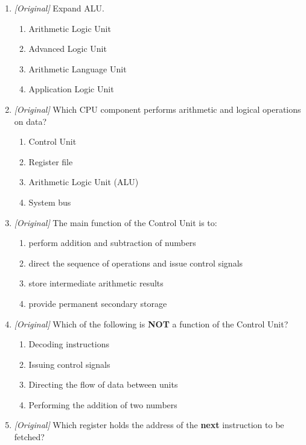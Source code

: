 \begin{enumerate}[label=\textbf{Q\arabic*.}, leftmargin=*]
\item \textit{[Original]} Expand ALU.
  \begin{enumerate}[label=\Alph*.]
    \item Arithmetic Logic Unit
    \item Advanced Logic Unit
    \item Arithmetic Language Unit
    \item Application Logic Unit
  \end{enumerate}
\item \textit{[Original]} Which CPU component performs arithmetic and
  logical operations on data?
  \begin{enumerate}[label=\Alph*.]
    \item Control Unit
    \item Register file
    \item Arithmetic Logic Unit (ALU)
    \item System bus
  \end{enumerate}
\item \textit{[Original]} The main function of the Control Unit is to:
  \begin{enumerate}[label=\Alph*.]
    \item perform addition and subtraction of numbers
    \item direct the sequence of operations and issue control signals
    \item store intermediate arithmetic results
    \item provide permanent secondary storage
  \end{enumerate}
\item \textit{[Original]} Which of the following is \textbf{NOT} a function
  of the Control Unit?
  \begin{enumerate}[label=\Alph*.]
    \item Decoding instructions
    \item Issuing control signals
    \item Directing the flow of data between units
    \item Performing the addition of two numbers
  \end{enumerate}
\item \textit{[Original]} Which register holds the address of the
  \textbf{next} instruction to be fetched?
  \begin{enumerate}[label=\Alph*.]

\end{enumerate}
\end{enumerate}
